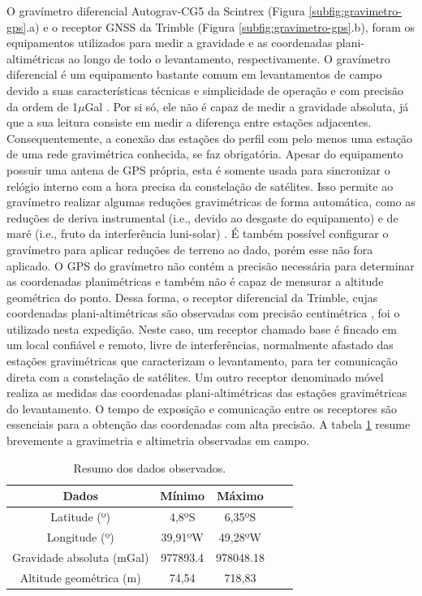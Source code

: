 O gravímetro diferencial Autograv-CG5 da Scintrex (Figura \ref{subfig:gravimetro-gps}.a) e o receptor GNSS da Trimble (Figura \ref{subfig:gravimetro-gps}.b), foram os equipamentos utilizados para medir a gravidade e as coordenadas plani-altimétricas ao longo de todo o levantamento, respectivamente. O gravímetro diferencial é um equipamento bastante comum em levantamentos de campo devido a suas características técnicas e simplicidade de operação \cite{cg5} e com precisão da ordem de 1$\mu$Gal \cite{on_cg5}. Por si só, ele não é capaz de medir a gravidade absoluta, já que a sua leitura consiste em medir a diferença entre estações adjacentes. Consequentemente, a conexão das estações do perfil com pelo menos uma estação de uma rede gravimétrica conhecida, se faz obrigatória. Apesar do equipamento possuir uma antena de GPS própria, esta é somente usada para sincronizar o relógio interno com a hora precisa da constelação de satélites. Isso permite ao gravímetro realizar algumas reduções gravimétricas de forma automática, como as reduções de deriva instrumental (i.e., devido ao desgaste do equipamento) e de maré (i.e., fruto da interferência luni-solar) \cite{geodesia}. É também possível configurar o gravímetro para aplicar reduções de terreno ao dado, porém esse não fora aplicado. O GPS do gravímetro não contém a precisão necessária para determinar as coordenadas planimétricas e também não é capaz de mensurar a altitude geométrica do ponto. Dessa forma, o receptor diferencial da Trimble, cujas coordenadas plani-altimétricas são observadas com precisão centimétrica \cite{trimble,gps}, foi o utilizado nesta expedição. Neste caso, um receptor chamado base é fincado em um local confiável e remoto, livre de interferências, normalmente afastado das estações gravimétricas que caracterizam o levantamento, para ter comunicação direta com a constelação de satélites. Um outro receptor denominado móvel realiza as medidas das coordenadas plani-altimétricas das estações gravimétricas do levantamento. O tempo de exposição e comunicação entre os receptores são essenciais para a obtenção das coordenadas com alta precisão. A tabela \ref{tab:dados_terrestre} resume brevemente a gravimetria e altimetria observadas em campo.

\begin{table}[h]
	\centering
	\caption{Resumo dos dados observados.} \label{tab:dados_terrestre}
	\begin{tabular}{c|c|c|c|c}
		
		Dados & Mínimo & Máximo  \\ 
		\hline                               %
		Latitude (º) & 4,8ºS & 6,35ºS \\
		Longitude (º) & 39,91ºW & 49,28ºW \\
		Gravidade absoluta (mGal) & 977893.4 & 978048.18 \\
		Altitude geométrica (m) & 74,54 & 718,83
	\end{tabular}
\end{table}

